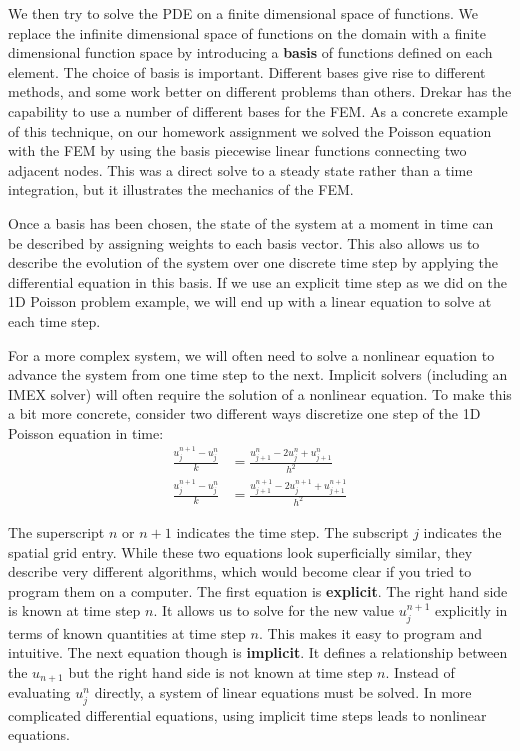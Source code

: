 \documentclass[11pt]{article} %
\begin{document}
We then try to solve the PDE on a finite dimensional space of functions.
We replace the infinite dimensional space of functions on the domain with a finite
dimensional function space by introducing a \textbf{basis} of functions defined on each element.
The choice of basis is important.  
Different bases give rise to different methods, and some work better on different problems than others.
Drekar has the capability to use a number of different bases for the FEM.
As a concrete example of this technique, on our homework assignment we solved the Poisson
equation with the FEM by using the basis piecewise linear functions 
connecting two adjacent nodes.  
This was a direct solve to a steady state rather than a time integration,
but it illustrates the mechanics of the FEM.

Once a basis has been chosen, the state of the system at a moment in time
can be described by assigning weights to each basis vector.  
This also allows us to describe the evolution of the system over one discrete
time step by applying the differential equation in this basis.
If we use an explicit time step as we did on the 1D Poisson problem
example, we will end up with a linear equation to solve at each time step.

For a more complex system, we will often need to solve a nonlinear equation
to advance the system from one time step to the next.
Implicit solvers (including an IMEX solver) will often require the solution of a nonlinear equation.
To make this a bit more concrete, consider two different ways discretize one
step of the 1D Poisson equation in time:
\begin{align}
\frac{u^{n+1}_{j} - u^{n}_{j}}{k} &= \frac{u^{n}_{j+1} - 2u^{n}_{j} + u^{n}_{j+1} }{h^2} \\
\frac{u^{n+1}_{j} - u^{n}_{j}}{k} &= \frac{u^{n+1}_{j+1} - 2u^{n+1}_{j} + u^{n+1}_{j+1} }{h^2}
\end{align}

The superscript $n$ or $n+1$ indicates the time step.  
The subscript $j$ indicates the spatial grid entry.
While these two equations look superficially similar, they describe very different algorithms, 
which would become clear if you tried to program them on a computer.
The first equation is \textbf{explicit}.  The right hand side is known at time step $n$.
It allows us to solve for the new value $u^{n+1}_{j}$ explicitly in terms of known quantities at time step $n$.
This makes it easy to program and intuitive.
The next equation though is \textbf{implicit}.  
It defines a relationship between the $u_{n+1}$ but the right hand side is not known at time step $n$.
Instead of evaluating $u^{n}_{j}$ directly, a system of linear equations must be solved.
In more complicated differential equations, using implicit time steps leads to nonlinear equations.
\end{document}
